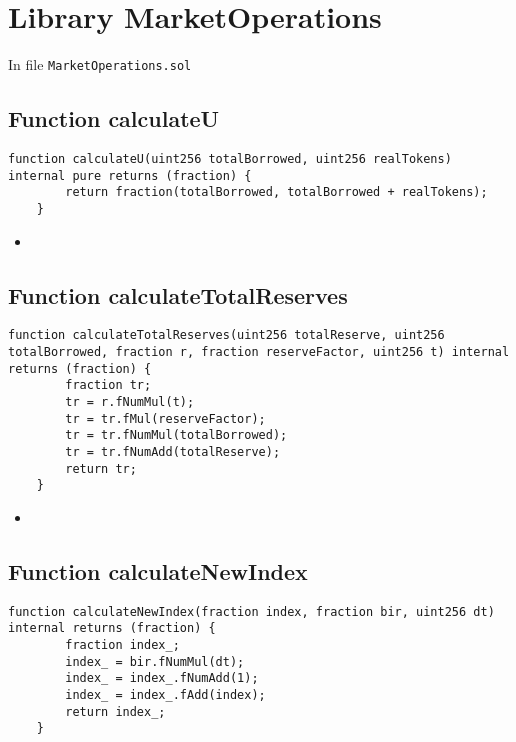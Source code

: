 

\section{Library MarketOperations}

In file {\tt MarketOperations.sol}


\subsection{Function calculateU}

\begin{lstlisting}[firstnumber=9]
    function calculateU(uint256 totalBorrowed, uint256 realTokens) internal pure returns (fraction) {
        return fraction(totalBorrowed, totalBorrowed + realTokens);
    }
\end{lstlisting}

\noindent\begin{itemize}
  \item {}
\end{itemize}


\subsection{Function calculateTotalReserves}

\begin{lstlisting}[firstnumber=28]
    function calculateTotalReserves(uint256 totalReserve, uint256 totalBorrowed, fraction r, fraction reserveFactor, uint256 t) internal returns (fraction) {
        fraction tr;
        tr = r.fNumMul(t);
        tr = tr.fMul(reserveFactor);
        tr = tr.fNumMul(totalBorrowed);
        tr = tr.fNumAdd(totalReserve);
        return tr;
    }
\end{lstlisting}

\noindent\begin{itemize}
  \item {}
\end{itemize}


\subsection{Function calculateNewIndex}

\begin{lstlisting}[firstnumber=37]
    function calculateNewIndex(fraction index, fraction bir, uint256 dt) internal returns (fraction) {
        fraction index_;
        index_ = bir.fNumMul(dt);
        index_ = index_.fNumAdd(1);
        index_ = index_.fAdd(index);
        return index_;
    }
\end{lstlisting}

